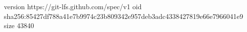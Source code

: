 version https://git-lfs.github.com/spec/v1
oid sha256:85427df788a41e7b9974c23b809342e957deb3adc4338427819e66e7966041e9
size 43840
